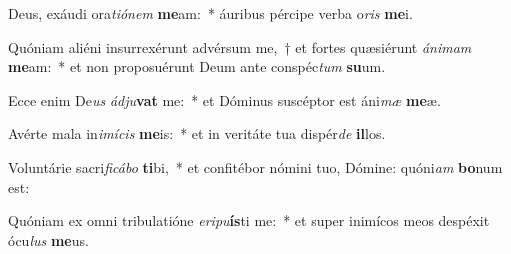 \item Deus, exáudi ora\textit{ti}\textit{ó}\textit{nem} \textbf{me}am:~* áuribus pércipe verba o\textit{ris} \textbf{me}i.
\item Quóniam aliéni insurrexérunt advérsum me,~† et fortes quæsiérunt \textit{á}\textit{ni}\textit{mam} \textbf{me}am:~* et non proposuérunt Deum ante conspéc\textit{tum} \textbf{su}um.
\item Ecce enim De\textit{us} \textit{ád}\textit{ju}\textbf{vat} me:~* et Dóminus suscéptor est áni\textit{mæ} \textbf{me}æ.
\item Avérte mala in\textit{i}\textit{mí}\textit{cis} \textbf{me}is:~* et in veritáte tua dispér\textit{de} \textbf{il}los.
\item Voluntárie sacri\textit{fi}\textit{cá}\textit{bo} \textbf{ti}bi,~* et confitébor nómini tuo, Dómine: quóni\textit{am} \textbf{bo}num est:
\item Quóniam ex omni tribulatióne \textit{e}\textit{ri}\textit{pu}\textbf{ís}ti me:~* et super inimícos meos despéxit ócu\textit{lus} \textbf{me}us.
